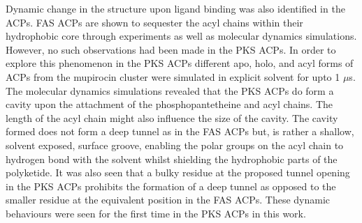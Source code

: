 	Dynamic change in the structure upon ligand binding  was also identified in the ACPs. FAS ACPs are shown to sequester the acyl chains within their hydrophobic core through experiments as well as molecular dynamics simulations. However, no such observations had been made in the PKS ACPs. In order to explore this phenomenon in the PKS ACPs different apo, holo, and acyl forms of ACPs from the mupirocin cluster were simulated in explicit solvent for upto 1 $ \mu $s. The molecular dynamics simulations revealed that the PKS ACPs do form a cavity upon the attachment of the phosphopantetheine and acyl chains. The length of the acyl chain might also influence the size of the cavity. The cavity formed does not form a deep tunnel as in the FAS ACPs but, is rather a shallow, solvent exposed, surface groove, enabling the polar groups on the acyl chain to hydrogen bond with the solvent whilst shielding the hydrophobic parts of the polyketide.  It was also seen that a bulky residue at the proposed tunnel opening in the PKS ACPs prohibits the formation of a deep tunnel as opposed to the smaller residue at the equivalent position in the FAS ACPs. These dynamic behaviours were seen for the first time in the PKS ACPs in this work. %
	
